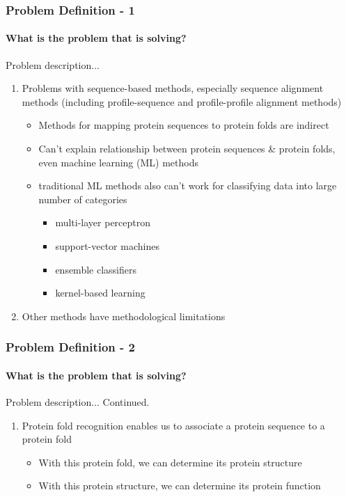 \documentclass[xcolor={usenames,dvipsnames},hyperref={hyperindex,bookmarks}]{beamer}
\begin{document}
\frame
{
	\frametitle{Problem Definition - 1}
	\framesubtitle{What is the problem that \cite{Hou2018} is solving?}

	Problem description...
	\begin{enumerate}
	\item Problems with sequence-based methods, especially sequence alignment methods (including profile-sequence and profile-profile alignment methods)  %
		\begin{itemize}
		\item Methods for mapping protein sequences to protein folds are indirect
		\item Can't explain relationship between protein sequences \& protein folds, even machine learning (ML) methods
		\item traditional ML methods also can't work for classifying data into large number of categories
			\begin{itemize}
			\item multi-layer perceptron
			\item support-vector machines
			\item ensemble classifiers
			\item kernel-based learning
			\end{itemize}
		\end{itemize}
	\item Other methods have methodological limitations %
	\end{enumerate}

}




\frame
{
	\frametitle{Problem Definition - 2}
	\framesubtitle{What is the problem that \cite{Hou2018} is solving?}

	Problem description... Continued.
	\begin{enumerate}
	\item Protein fold recognition enables us to associate a protein sequence to a protein fold
		\begin{itemize}	%
		\item With this protein fold, we can determine its protein structure
		\item With this protein structure, we can determine its protein function
		\end{itemize}
	\end{enumerate}

}
\end{document}
